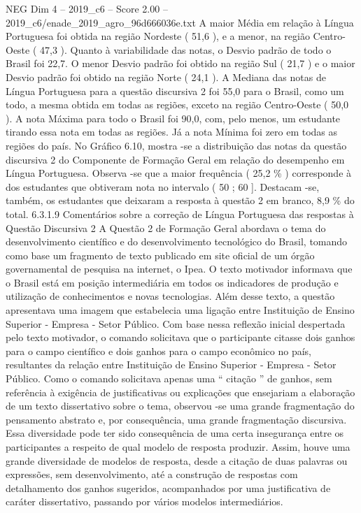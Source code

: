 \begin{textsample}{NEG Dim 4 – 2019\_c6 – Score 2.00 – 2019\_c6/enade\_2019\_agro\_96d666036e.txt}
A maior Média em relação à Língua Portuguesa foi obtida na região Nordeste ( 51,6 ), e a menor, na região Centro-Oeste ( 47,3 ).
Quanto à variabilidade das notas, o Desvio padrão de todo o Brasil foi 22,7.
O menor Desvio padrão foi obtido na região Sul ( 21,7 ) e o maior Desvio padrão foi obtido na região Norte ( 24,1 ).
A Mediana das notas de Língua Portuguesa para a questão discursiva 2 foi 55,0 para o Brasil, como um todo, a mesma obtida em todas as regiões, exceto na região Centro-Oeste ( 50,0 ).
A nota Máxima para todo o Brasil foi 90,0, com, pelo menos, um estudante tirando essa nota em todas as regiões.
Já a nota Mínima foi zero em todas as regiões do país.
No Gráfico 6.10, mostra -se a distribuição das notas da questão discursiva 2 do Componente de Formação Geral em relação do desempenho em Língua Portuguesa.
Observa -se que a maior frequência ( 25,2 \% ) corresponde à dos estudantes que obtiveram nota no intervalo ( 50 ; 60 ].
Destacam -se, também, os estudantes que deixaram a resposta à questão 2 em branco, 8,9 \% do total. 6.3.1.9 Comentários sobre a correção de Língua Portuguesa das respostas à Questão Discursiva 2 A Questão 2 de Formação Geral abordava o tema do desenvolvimento científico e do desenvolvimento tecnológico do Brasil, tomando como base um fragmento de texto publicado em site oficial de um órgão governamental de pesquisa na internet, o Ipea.
O texto motivador informava que o Brasil está em posição intermediária em todos os indicadores de produção e utilização de conhecimentos e novas tecnologias.
Além desse texto, a questão apresentava uma imagem que estabelecia uma ligação entre Instituição de Ensino Superior - Empresa - Setor Público.
Com base nessa reflexão inicial despertada pelo texto motivador, o comando solicitava que o participante citasse dois ganhos para o campo científico e dois ganhos para o campo econômico no país, resultantes da relação entre Instituição de Ensino Superior - Empresa - Setor Público.
Como o comando solicitava apenas uma “ citação ” de ganhos, sem referência à exigência de justificativas ou explicações que ensejariam a elaboração de um texto dissertativo sobre o tema, observou -se uma grande fragmentação do pensamento abstrato e, por consequência, uma grande fragmentação discursiva.
Essa diversidade pode ter sido consequência de uma certa insegurança entre os participantes a respeito de qual modelo de resposta produzir.
Assim, houve uma grande diversidade de modelos de resposta, desde a citação de duas palavras ou expressões, sem desenvolvimento, até a construção de respostas com detalhamento dos ganhos sugeridos, acompanhados por uma justificativa de caráter dissertativo, passando por vários modelos intermediários.

\end{textsample}
